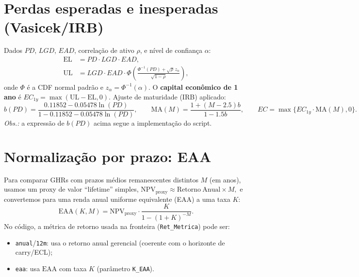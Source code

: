 \documentclass[11pt,a4paper]{article}
\newcommand{\1}{\mathbf{1}}
\begin{document}
\section{Perdas esperadas e inesperadas (Vasicek/IRB)}
Dados $PD$, $LGD$, $EAD$, correlação de ativo $\rho$, e nível de confiança $\alpha$:
\begin{align}
\mathrm{EL} &= PD \cdot LGD \cdot EAD,\\
\mathrm{UL} &= LGD \cdot EAD \cdot \Phi\!\left(\frac{\Phi^{-1}(PD)+\sqrt{\rho}\, z_\alpha}{\sqrt{1-\rho}}\right),
\end{align}
onde $\Phi$ é a CDF normal padrão e $z_\alpha = \Phi^{-1}(\alpha)$. O \textbf{capital econômico de 1 ano} é $EC_{1y}=\max(\mathrm{UL}-\mathrm{EL},0)$. Ajuste de maturidade (IRB) aplicado:
\begin{equation}
b(PD) = \frac{0.11852 - 0.05478\ln(PD)}{1-0.11852-0.05478\ln(PD)},\qquad
\mathrm{MA}(M)=\frac{1+(M-2.5)b}{1-1.5b},\qquad
EC = \max\{EC_{1y}\cdot \mathrm{MA}(M),0\}.
\end{equation}
\textit{Obs.:} a expressão de $b(PD)$ acima segue a implementação do script.

\section{Normalização por prazo: EAA}
Para comparar GHRs com prazos médios remanescentes distintos $M$ (em anos), usamos um proxy de valor ``lifetime'' simples,
\(
\mathrm{NPV}_{\text{proxy}} \approx \mathrm{Retorno\ Anual}\times M,
\)
e convertemos para uma renda anual uniforme equivalente (EAA) a uma taxa $K$:
\begin{equation}
\mathrm{EAA}(K,M) = \mathrm{NPV}_{\text{proxy}}\cdot \frac{K}{1-(1+K)^{-M}}.
\end{equation}
No código, a métrica de retorno usada na fronteira (\texttt{Ret\_Metrica}) pode ser:
\begin{itemize}[noitemsep]
  \item \texttt{anual}/\texttt{12m}: usa o retorno anual gerencial (coerente com o horizonte de carry/ECL);
  \item \texttt{eaa}: usa $\mathrm{EAA}$ com taxa $K$ (parâmetro \texttt{K\_EAA}).
\end{itemize}
\end{document}
